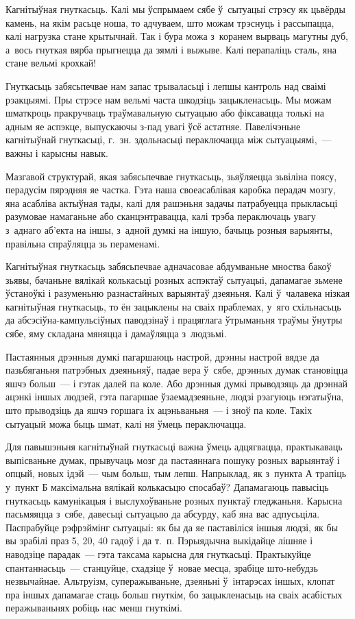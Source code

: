 Кагнітыўная гнуткасьць. Калі мы ўспрымаем сябе ў~сытуацыі стрэсу як цьвёрды камень, на якім расьце ноша, то адчуваем, што можам трэснуць і рассыпацца, калі нагрузка стане крытычнай. Так і бура можа з~коранем вырваць магутны дуб, а~вось гнуткая вярба прыгнецца да зямлі і выжыве. Калі перапаліць сталь, яна стане вельмі крохкай!

Гнуткасьць забясьпечвае нам запас трываласьці і лепшы кантроль над сваімі рэакцыямі. Пры стрэсе нам вельмі часта шкодзіць зацыкленасьць. Мы можам шматкроць пракручваць траўмавальную сытуацыю або фіксавацца толькі на адным яе аспэкце, выпускаючы з-пад увагі ўсё астатняе. Павелічэньне кагнітыўнай гнуткасьці, г.~зн. здольнасьці пераключацца між сытуацыямі,~--- важны і карысны навык. 

Мазгавой структурай, якая забясьпечвае гнуткасьць, зьяўляецца зьвіліна поясу, перадусім пярэдняя яе частка. Гэта наша своеасаблівая каробка перадач мозгу, яна асабліва актыўная тады, калі для рашэньня задачы патрабуецца прыкласьці разумовае намаганьне або сканцэнтравацца, калі трэба пераключаць увагу з~аднаго аб'екта на іншы, з~адной думкі на іншую, бачыць розныя варыянты, правільна спраўляцца зь пераменамі.

Кагнітыўная гнуткасьць забясьпечвае адначасовае абдумваньне мноства бакоў зьявы, бачаньне вялікай колькасьці розных аспэктаў сытуацыі, дапамагае зьмене ўстаноўкі і разуменьню разнастайных варыянтаў дзеяньня. Калі ў~чалавека нізкая кагнітыўная гнуткасьць, то ён зацыклены на сваіх праблемах, у~яго схільнасьць да абсэсіўна-кампульсіўных паводзінаў і працяглага ўтрыманьня траўмы ўнутры сябе, яму складана мяняцца і дамаўляцца з~людзьмі.

Пастаянныя дрэнныя думкі пагаршаюць настрой, дрэнны настрой вядзе да пазьбяганьня патрэбных дзеяньняў, падае вера ў~сябе, дрэнных думак становіцца яшчэ больш~--- і гэтак далей па коле. Або дрэнныя думкі прыводзяць да дрэннай ацэнкі іншых людзей, гэта пагаршае ўзаемадзеяньне, людзі рэагуюць нэгатыўна, што прыводзіць да яшчэ горшага іх ацэньваньня~--- і зноў па коле. Такіх сытуацый можа быць шмат, калі ня ўмець пераключацца.

Для павышэньня кагнітыўнай гнуткасьці важна ўмець адцягвацца, практыкаваць выпісваньне думак, прывучаць мозг да пастаяннага пошуку розных варыянтаў і опцый, новых ідэй~--- чым больш, тым лепш. Напрыклад, як з~пункта А трапіць у~пункт Б максімальна вялікай колькасьцю спосабаў? Дапамагаюць павысіць гнуткасьць камунікацыя і выслухоўваньне розных пунктаў гледжаньня. Карысна пасьмяяцца з~сябе, давесьці сытуацыю да абсурду, каб яна вас адпусьціла. Паспрабуйце рэфрэймінг сытуацыі: як бы да яе паставіліся іншыя людзі, як бы вы зрабілі праз 5, 20, 40 гадоў і да т.~п. Пэрыядычна выкідайце лішняе і наводзіце парадак~--- гэта таксама карысна для гнуткасьці. Практыкуйце спантаннасьць~--- станцуйце, схадзіце ў~новае месца, зрабіце што-небудзь незвычайнае. Альтруізм, суперажываньне, дзеяньні ў~інтарэсах іншых, клопат пра іншых дапамагае стаць больш гнуткім, бо зацыкленасьць на сваіх асабістых перажываньнях робіць нас менш гнуткімі.

